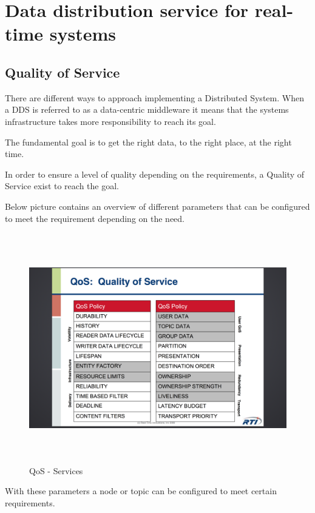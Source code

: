 \section{Data distribution service for real-time systems}

\subsection{Quality of Service }

There are different ways to approach implementing a Distributed System. When a DDS is referred to as a data-centric middleware it means that the systems infrastructure takes more responsibility to reach its goal.

The fundamental goal is to get the right data, to the right place, at the right time.

In order to ensure a level of quality depending on the requirements, a Quality of Service exist to reach the goal.

Below picture contains an overview of different parameters that can be configured to meet the requirement depending on the need.

\begin{figure}[h]
\centering
\includegraphics[height=100mm, keepaspectratio]{img/dds_question_4-6/QoS_services}
\caption{QoS - Services}
\label{QoS - Services}
\end{figure}

\newpage

With these parameters a node or topic can be configured to meet certain requirements. 


